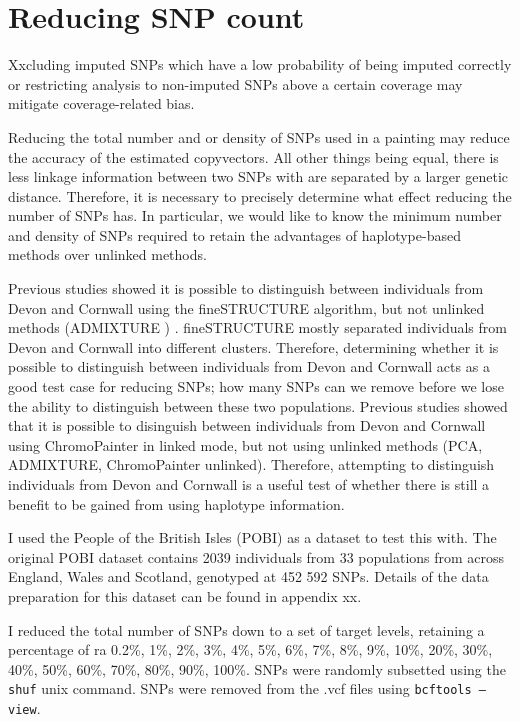 \section{Reducing SNP count}

Xxcluding imputed SNPs which have a low probability of being imputed correctly or restricting analysis to non-imputed SNPs above a certain coverage may mitigate coverage-related bias.

Reducing the total number and or density of SNPs used in a painting may reduce the accuracy of the estimated copyvectors. All other things being equal, there is less linkage information between two SNPs with are separated by a larger genetic distance. Therefore, it is necessary to precisely determine what effect reducing the number of SNPs has. In particular, we would like to know the minimum number and density of SNPs required to retain the advantages of haplotype-based methods over unlinked methods. 

Previous studies showed it is possible to distinguish between individuals from Devon and Cornwall using the fineSTRUCTURE algorithm, but not unlinked methods (ADMIXTURE \cite{alexander2009fast}) \cite{Leslie2015}. fineSTRUCTURE mostly separated individuals from Devon and Cornwall into different clusters. Therefore, determining whether it is possible to distinguish between individuals from Devon and Cornwall acts as a good test case for reducing SNPs; how many SNPs can we remove before we lose the ability to distinguish between these two populations.
Previous studies showed that it is possible to disinguish between individuals from Devon and Cornwall using ChromoPainter in linked mode, but not using unlinked methods (PCA, ADMIXTURE, ChromoPainter unlinked). Therefore, attempting to distinguish individuals from Devon and Cornwall is a useful test of whether there is still a benefit to be gained from using haplotype information.  

I used the People of the British Isles (POBI) as a dataset to test this with. The original POBI dataset contains 2039 individuals from 33 populations from across England, Wales and Scotland, genotyped at 452 592 SNPs. Details of the data preparation for this dataset can be found in appendix xx.

I reduced the total number of SNPs down to a set of target levels, retaining a percentage of ra 0.2\%, 1\%, 2\%, 3\%, 4\%, 5\%, 6\%, 7\%, 8\%, 9\%, 10\%, 20\%, 30\%, 40\%, 50\%, 60\%, 70\%, 80\%, 90\%, 100\%. SNPs were randomly subsetted using the \texttt{shuf} unix command. SNPs were removed from the .vcf files using \texttt{bcftools --view}.


